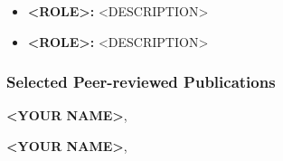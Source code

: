 \begin{itemize}[leftmargin=0.4cm]

  \item
  \textbf{<ROLE>:} <DESCRIPTION>

  \vspace{-.5em}
  \item
  \textbf{<ROLE>:} <DESCRIPTION>


\end{itemize}



\vspace{-1.5em}
\subsubsection*{Selected Peer-reviewed Publications}
\vspace{-.5em}

\begin{list}{}{\leftmargin=2em \itemindent=-2em}

  \item
  \textbf{<YOUR NAME>}, \lipsum[1][1-2]

  \vspace{-.5em}
  \item
  \textbf{<YOUR NAME>}, \lipsum[1][2-3]

\end{list}